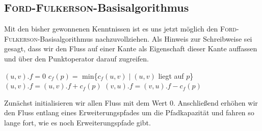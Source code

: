 \documentclass[12pt,a4paper,titlepage,onecolumn,ngerman,bibliography=totocnumbered]{scrartcl}
\theoremstyle{definition}
\theoremstyle{remark}
\newcommand{\ff}{\textsc{Ford-Fulkerson}}
\begin{document}
\subsection{\ff -Basisalgorithmus}
Mit den bisher gewonnenen Kenntnissen ist es uns jetzt möglich den \ff -Basisalgorithmus nachzuvollziehen.
Als Hinweis zur Schreibweise sei gesagt, dass wir den Fluss auf einer Kante als Eigenschaft dieser Kante auffassen und über den Punktoperator darauf zugreifen.
\begin{algorithm}[H]
	\caption{\ff (G,s,t)}
	\label{alg:ff}
	\begin{algorithmic}[1]
		\State $(u,v).f = 0$
		\EndFor
		\State $c_{f}(p) =$ min\{$c_{f}(u,v) \mid (u,v)$ liegt auf $p$\}
		\State $(u,v).f = (u,v).f + c_{f}(p)$
		\Else
		\State $(v,u).f = (v,u).f - c_{f}(p)$
		\EndIf
		\EndFor
		\EndWhile
	\end{algorithmic}
\end{algorithm}
Zunächst initialisieren wir allen Fluss mit dem Wert $0$.
Anschließend erhöhen wir den Fluss entlang eines Erweiterungspfades um die Pfadkapazität und fahren so lange fort, wie es noch Erweiterungspfade gibt.
\end{document}
